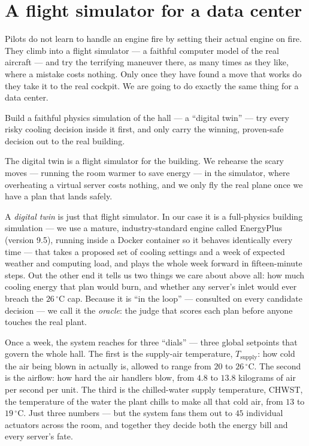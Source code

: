 \documentclass[11pt]{report}
\begin{document}
\section{A flight simulator for a data center}

Pilots do not learn to handle an engine fire by setting their actual engine on fire. They climb into a flight simulator --- a faithful computer model of the real aircraft --- and try the terrifying maneuver there, as many times as they like, where a mistake costs nothing. Only once they have found a move that works do they take it to the real cockpit. We are going to do exactly the same thing for a data center.

\begin{keyidea}
Build a faithful physics simulation of the hall --- a ``digital twin'' --- try every risky cooling decision inside it first, and only carry the winning, proven-safe decision out to the real building.
\end{keyidea}

\begin{analogy}
The digital twin is a flight simulator for the building. We rehearse the scary moves --- running the room warmer to save energy --- in the simulator, where overheating a virtual server costs nothing, and we only fly the real plane once we have a plan that lands safely.
\end{analogy}

A \emph{digital twin} is just that flight simulator. In our case it is a full-physics building simulation --- we use a mature, industry-standard engine called EnergyPlus (version 9.5), running inside a Docker container so it behaves identically every time --- that takes a proposed set of cooling settings and a week of expected weather and computing load, and plays the whole week forward in fifteen-minute steps. Out the other end it tells us two things we care about above all: how much cooling energy that plan would burn, and whether any server's inlet would ever breach the $26\,^\circ\mathrm{C}$ cap. Because it is ``in the loop'' --- consulted on every candidate decision --- we call it the \emph{oracle}: the judge that scores each plan before anyone touches the real plant.

Once a week, the system reaches for three ``dials'' --- three global setpoints that govern the whole hall. The first is the supply-air temperature, $T_{\text{supply}}$: how cold the air being blown in actually is, allowed to range from $20$ to $26\,^\circ\mathrm{C}$. The second is the airflow: how hard the air handlers blow, from $4.8$ to $13.8$ kilograms of air per second per unit. The third is the chilled-water supply temperature, CHWST, the temperature of the water the plant chills to make all that cold air, from $13$ to $19\,^\circ\mathrm{C}$. Just three numbers --- but the system fans them out to $45$ individual actuators across the room, and together they decide both the energy bill and every server's fate.
\end{document}
